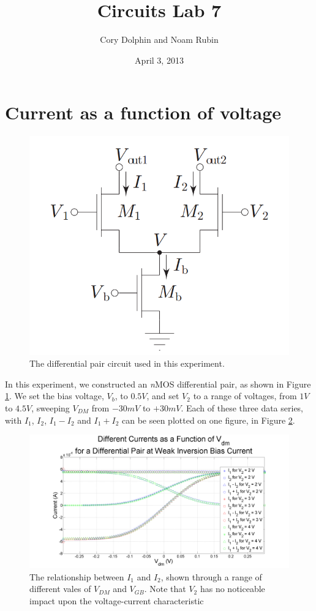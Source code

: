 \documentclass{article}
\title{Circuits Lab 7}
\author{Cory Dolphin and Noam Rubin}
\date{April 3, 2013}
\newcommand{\Vgb}{{$V_{GB}$}}
\newcommand{\Vb}{{$V_{b}$}}
\newcommand{\nMOS}{{\textit{n}MOS }}
\begin{document}
\maketitle

\section*{Current as a function of voltage}
\begin{figure}[H]
\centering
\includegraphics[width=0.65\linewidth]{./Figures/Schematic.png}
\caption{The differential pair circuit used in this experiment.}
\label{fig:Schematic}
\end{figure}

In this experiment, we constructed an \nMOS differential pair, as shown in Figure \ref{fig:Schematic}. We set the bias voltage, \Vb, to $0.5V$, and set $V_2$ to a range of voltages, from $1V$ to $4.5V$, sweeping $V_{DM}$ from $-30mV$ to $+30mV$. Each of these three data series, with $I_1$, $I_2$, $I_1 - I_2$ and $I_1 + I_2$ can be seen plotted on one figure, in Figure \ref{fig:AllCurrentsOneFigure}.
\begin{figure}[H]
\centering
\includegraphics[width=\linewidth]{./Figures/AllCurrentsOneFigure}
\caption{The relationship between $I_1$ and $I_2$, shown through a range of different vales of $V_{DM}$ and \Vgb. Note that $V_2$ has no noticeable impact upon the voltage-current characteristic}
\label{fig:AllCurrentsOneFigure}
\end{figure}
\end{document}
